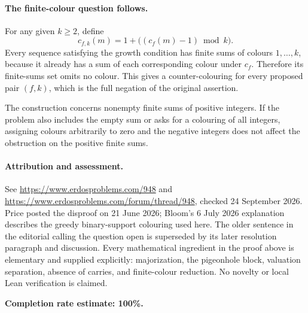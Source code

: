 \paragraph{The finite-colour question follows.}
For any given \(k\geq2\), define
\[
 c_{f,k}(m)=1+\bigl((c_f(m)-1)\bmod k\bigr).
\]
Every sequence satisfying the growth condition has finite sums of colours \(1,\ldots,k\), because it already has a sum of each corresponding colour under \(c_f\). Therefore its finite-sums set omits no colour. This gives a counter-colouring for every proposed pair \((f,k)\), which is the full negation of the original assertion.

The construction concerns nonempty finite sums of positive integers. If the problem also includes the empty sum or asks for a colouring of all integers, assigning colours arbitrarily to zero and the negative integers does not affect the obstruction on the positive finite sums.

\paragraph{Attribution and assessment.}
See \url{https://www.erdosproblems.com/948} and \url{https://www.erdosproblems.com/forum/thread/948}, checked 24 September 2026. Price posted the disproof on 21 June 2026; Bloom's 6 July 2026 explanation describes the greedy binary-support colouring used here. The older sentence in the editorial calling the question open is superseded by its later resolution paragraph and discussion. Every mathematical ingredient in the proof above is elementary and supplied explicitly: majorization, the pigeonhole block, valuation separation, absence of carries, and finite-colour reduction. No novelty or local Lean verification is claimed.

\textbf{Completion rate estimate: 100\%.}
